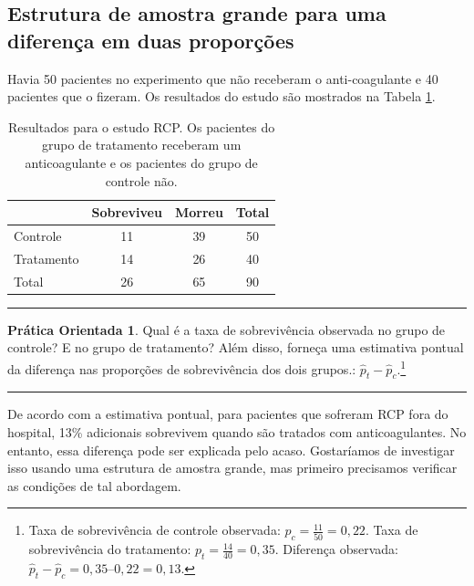 \documentclass[
]{book}
\theoremstyle{definition}
\theoremstyle{definition}
\theoremstyle{definition}
\newtheorem{exercise}{Prática Orientada}[chapter]
\theoremstyle{definition}
\theoremstyle{remark}
\begin{document}
\hypertarget{largeSampleStructureDifferenceTwoProportions}{%
\subsection{Estrutura de amostra grande para uma diferença em duas proporções}\label{largeSampleStructureDifferenceTwoProportions}}

Havia 50 pacientes no experimento que não receberam o anti-coagulante e 40 pacientes que o fizeram. Os resultados do estudo são mostrados na Tabela \ref{tab:resultsForCPRStudyInSmallSampleSection}.

\begin{table}

\caption{\label{tab:resultsForCPRStudyInSmallSampleSection}Resultados para o estudo RCP. Os pacientes do grupo de tratamento receberam um anticoagulante e os pacientes do grupo de controle não.}
\centering
\begin{tabular}[t]{l|c|c|c}
\hline
  & Sobreviveu & Morreu & Total\\
\hline
Controle & 11 & 39 & 50\\
\hline
Tratamento & 14 & 26 & 40\\
\hline
Total & 26 & 65 & 90\\
\hline
\end{tabular}
\end{table}

\begin{center}\rule{0.5\linewidth}{0.5pt}\end{center}

\begin{exercise}
\protect\hypertarget{exr:unnamed-chunk-263}{}{\label{exr:unnamed-chunk-263} }Qual é a taxa de sobrevivência observada no grupo de controle? E no grupo de tratamento? Além disso, forneça uma estimativa pontual da diferença nas proporções de sobrevivência dos dois grupos.: \(\hat{p}_t - \hat{p}_c\).\footnote{Taxa de sobrevivência de controle observada: \(p_c = \frac{11}{50} = 0,22\). Taxa de sobrevivência do tratamento: \(p_t = \frac{14}{40} = 0,35\). Diferença observada: \(\hat{p}_t - \hat{p}_c = 0,35 – 0,22 = 0,13\).}
\end{exercise}

\begin{center}\rule{0.5\linewidth}{0.5pt}\end{center}

De acordo com a estimativa pontual, para pacientes que sofreram RCP fora do hospital, 13\% adicionais sobrevivem quando são tratados com anticoagulantes. No entanto, essa diferença pode ser explicada pelo acaso. Gostaríamos de investigar isso usando uma estrutura de amostra grande, mas primeiro precisamos verificar as condições de tal abordagem.
\end{document}
